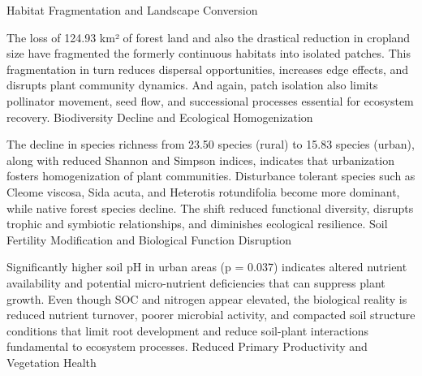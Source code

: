 Habitat Fragmentation and Landscape Conversion

The loss of 124.93 km² of forest land and also the drastical reduction in cropland size have fragmented the formerly continuous habitats into isolated patches. This fragmentation in turn reduces dispersal opportunities, increases edge effects, and disrupts plant community dynamics. And again, patch isolation also limits pollinator movement, seed flow, and successional processes essential for ecosystem recovery.
Biodiversity Decline and Ecological Homogenization

The decline in species richness from 23.50 species (rural) to 15.83 species (urban), along with reduced Shannon and Simpson indices, indicates that urbanization fosters homogenization of plant communities. Disturbance tolerant species such as Cleome viscosa, Sida acuta, and Heterotis rotundifolia become more dominant, while native forest species decline. The shift reduced functional diversity, disrupts trophic and symbiotic relationships, and diminishes ecological resilience.
Soil Fertility Modification and Biological Function Disruption

Significantly higher soil pH in urban areas (p = 0.037) indicates altered nutrient availability and potential micro-nutrient deficiencies that can suppress plant growth. Even though SOC and nitrogen appear elevated, the biological reality is reduced nutrient turnover, poorer microbial activity, and compacted soil structure conditions that limit root development and reduce soil-plant interactions fundamental to ecosystem processes.
Reduced Primary Productivity and Vegetation Health

